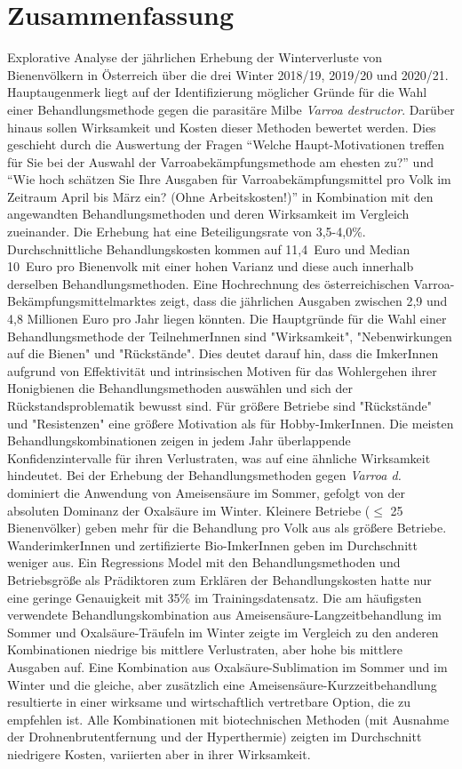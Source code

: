 \chapter*{Zusammenfassung}
\label{sec:Zusammenfassung}
\vspace*{-15mm}

Explorative Analyse der jährlichen Erhebung der Winterverluste von Bienenvölkern in Österreich über die drei Winter 2018/19, 2019/20 und 2020/21. Hauptaugenmerk liegt auf der Identifizierung möglicher Gründe für die Wahl einer Behandlungsmethode gegen die parasitäre Milbe \textit{Varroa destructor}. Darüber hinaus sollen Wirksamkeit und Kosten dieser Methoden bewertet werden. Dies geschieht durch die Auswertung der Fragen \enquote{Welche Haupt-Motivationen treffen für Sie bei der Auswahl der Varroabekämpfungsmethode am ehesten zu?} und \enquote{Wie hoch schätzen Sie Ihre Ausgaben für Varroabekämpfungsmittel pro Volk im Zeitraum April bis März ein? (Ohne Arbeitskosten!)} in Kombination mit den angewandten Behandlungsmethoden und deren Wirksamkeit im Vergleich zueinander. Die Erhebung hat eine Beteiligungsrate von 3,5-4,0\%. Durchschnittliche Behandlungskosten kommen auf 11,4~Euro und Median 10~Euro pro Bienenvolk mit einer hohen Varianz und diese auch innerhalb derselben Behandlungsmethoden. Eine Hochrechnung des österreichischen Varroa-Bekämpfungsmittelmarktes zeigt, dass die jährlichen Ausgaben zwischen 2,9 und 4,8 Millionen Euro pro Jahr liegen könnten. Die Hauptgründe für die Wahl einer Behandlungsmethode der TeilnehmerInnen sind "Wirksamkeit", "Nebenwirkungen auf die Bienen" und "Rückstände". Dies deutet darauf hin, dass die ImkerInnen aufgrund von Effektivität und intrinsischen Motiven für das Wohlergehen ihrer Honigbienen die Behandlungsmethoden auswählen und sich der Rückstandsproblematik bewusst sind. Für größere Betriebe sind "Rückstände" und "Resistenzen" eine größere Motivation als für Hobby-ImkerInnen. Die meisten Behandlungskombinationen zeigen in jedem Jahr überlappende Konfidenzintervalle für ihren Verlustraten, was auf eine ähnliche Wirksamkeit hindeutet. Bei der Erhebung der Behandlungsmethoden gegen \textit{Varroa d.} dominiert die Anwendung von Ameisensäure im Sommer, gefolgt von der absoluten Dominanz der Oxalsäure im Winter. Kleinere Betriebe ($\leq$ 25 Bienenvölker) geben mehr für die Behandlung pro Volk aus als größere Betriebe. WanderimkerInnen und zertifizierte Bio-ImkerInnen geben im Durchschnitt weniger aus. Ein Regressions Model mit den Behandlungsmethoden und Betriebsgröße als Prädiktoren zum Erklären der Behandlungskosten hatte nur eine geringe Genauigkeit mit 35\% im Trainingsdatensatz. Die am häufigsten verwendete Behandlungskombination aus Ameisensäure-Langzeitbehandlung im Sommer und Oxalsäure-Träufeln im Winter zeigte im Vergleich zu den anderen Kombinationen niedrige bis mittlere Verlustraten, aber hohe bis mittlere Ausgaben auf. Eine Kombination aus Oxalsäure-Sublimation im Sommer und im Winter und die gleiche, aber zusätzlich eine Ameisensäure-Kurzzeitbehandlung resultierte in einer wirksame und wirtschaftlich vertretbare Option, die zu empfehlen ist. Alle Kombinationen mit biotechnischen Methoden (mit Ausnahme der Drohnenbrutentfernung und der Hyperthermie) zeigten im Durchschnitt niedrigere Kosten, variierten aber in ihrer Wirksamkeit.
